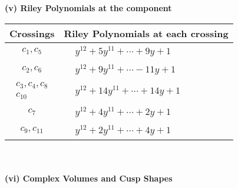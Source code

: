 \documentclass[1p]{elsarticle_modified}
\theoremstyle{definition}
\begin{document}
\newpage\renewcommand{\arraystretch}{1}
\flushleft \textbf{(v) Riley Polynomials at the component}\newline \\
\begin{tabular}{m{50pt}|m{274pt}}
Crossings & \hspace{64pt}Riley Polynomials at each crossing \\
\hline $$\begin{aligned}c_{1},c_{5}\end{aligned}$$&$\begin{aligned}
&y^{12}+5 y^{11}+\cdots+9 y+1
\end{aligned}$\\
\hline $$\begin{aligned}c_{2},c_{6}\end{aligned}$$&$\begin{aligned}
&y^{12}+9 y^{11}+\cdots-11 y+1
\end{aligned}$\\
\hline $$\begin{aligned}c_{3},c_{4},c_{8}\\c_{10}\end{aligned}$$&$\begin{aligned}
&y^{12}+14 y^{11}+\cdots+14 y+1
\end{aligned}$\\
\hline $$\begin{aligned}c_{7}\end{aligned}$$&$\begin{aligned}
&y^{12}+4 y^{11}+\cdots+2 y+1
\end{aligned}$\\
\hline $$\begin{aligned}c_{9},c_{11}\end{aligned}$$&$\begin{aligned}
&y^{12}+2 y^{11}+\cdots+4 y+1
\end{aligned}$\\
\hline
\end{tabular}\\~\\
\newpage\flushleft \textbf{(vi) Complex Volumes and Cusp Shapes}
\end{document}
